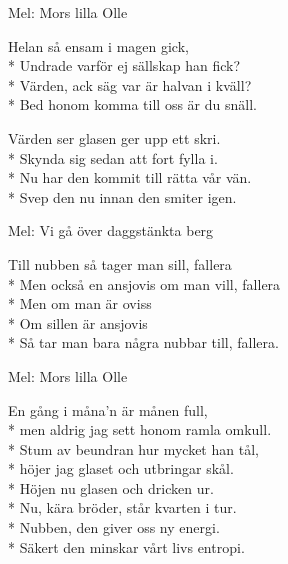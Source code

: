 \begin{SongText}[Påfyllningssång]
\begin{SongInfo}
    Mel: Mors lilla Olle
\end{SongInfo}
\begin{SongVerse}
    Helan så ensam i magen gick,\\*%
    Undrade varför ej sällskap han fick?\\*%
    Värden, ack säg var är halvan i kväll?\\*%
    Bed honom komma till oss är du snäll.
\end{SongVerse}
\begin{SongVerse}
    Värden ser glasen ger upp ett skri.\\*%
    Skynda sig sedan att fort fylla i.\\*%
    Nu har den kommit till rätta vår vän.\\*%
    Svep den nu innan den smiter igen.
\end{SongVerse}
\end{SongText}
\begin{SongText}
\begin{SongInfo}
    Mel: Vi gå över daggstänkta berg
\end{SongInfo}
\begin{SongVerse}
    Till nubben så tager man sill, fallera\\*%
    Men också en ansjovis om man vill, fallera\\*%
    Men om man är oviss\\*%
    Om sillen är ansjovis\\*%
    Så tar man bara några nubbar till, fallera.
\end{SongVerse}
\end{SongText}
\begin{SongText}
\begin{SongInfo}
    Mel: Mors lilla Olle
\end{SongInfo}
\begin{SongVerse}
    En gång i måna’n är månen full,\\*%
    men aldrig jag sett honom ramla omkull.\\*%
    Stum av beundran hur mycket han tål,\\*%
    höjer jag glaset och utbringar skål.\\*%
    Höjen nu glasen och dricken ur.\\*%
    Nu, kära bröder, står kvarten i tur.\\*%
    Nubben, den giver oss ny energi.\\*%
    Säkert den minskar vårt livs entropi.
\end{SongVerse}
\end{SongText}
